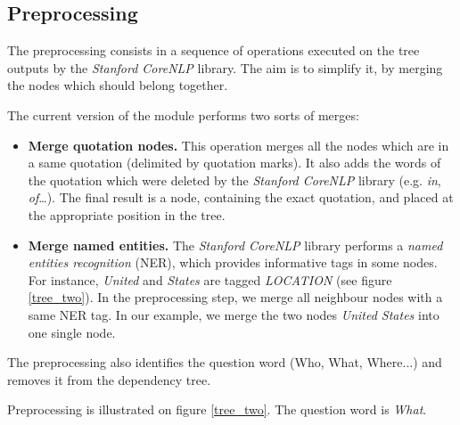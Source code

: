 
\subsection{Preprocessing}

The preprocessing consists in a sequence of operations executed on the tree outputs by the \emph{Stanford CoreNLP} library. The aim is to simplify it, by merging the nodes which should belong together.

The current version of the module performs two sorts of merges:
\begin{itemize}
    \item \textbf{Merge quotation nodes.} This operation merges all the nodes which are in a same quotation (delimited by quotation marks). It also adds the words
    of the quotation which were deleted by the \emph{Stanford CoreNLP} library (e.g. \emph{in}, \emph{of}\dots). The final result is a node, containing the
    exact quotation, and placed at the appropriate position in the tree.
    
    \item \textbf{Merge named entities.} The \emph{Stanford CoreNLP} library performs a \emph{named entities recognition} (NER), which provides informative 
    tags in some nodes. For instance, \emph{United} and \emph{States} are tagged \emph{LOCATION} (see figure \ref{tree_two}). In the preprocessing step, we merge all neighbour nodes with a same NER tag. In our example, we merge the two nodes \emph{United States} into one single node.
\end{itemize}

The preprocessing also identifies the question word (Who, What, Where...) and removes it from the dependency tree.

Preprocessing is illustrated on figure \ref{tree_two}. The question word is \textit{What}.

